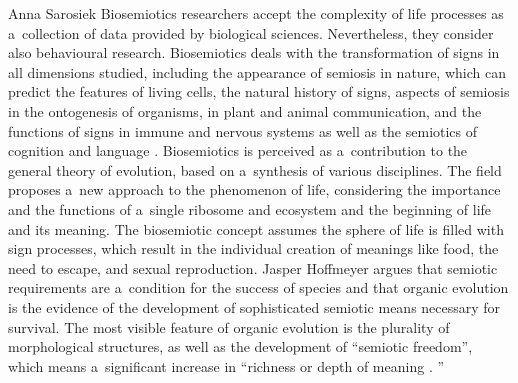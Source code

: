 \begin{artengenv}{Anna Sarosiek}
Biosemiotics researchers accept the complexity of life processes as a~collection of data provided by biological sciences. Nevertheless, they consider also behavioural research. Biosemiotics deals with the transformation of signs in all dimensions studied, including the appearance of semiosis in nature, which can predict the features of living cells, the natural history of signs, aspects of semiosis in the ontogenesis of organisms, in plant and animal communication, and the functions of signs in immune and nervous systems as well as the semiotics of cognition and language
\parencite[][p.78]{emmeche_modeling_1992}. %
 Biosemiotics is perceived as a~contribution to the general theory of evolution, based on a~synthesis of various disciplines. The field proposes a~new approach to the phenomenon of life, considering the importance and the functions of a~single ribosome and ecosystem and the beginning of life and its meaning. The biosemiotic concept assumes the sphere of life is filled with sign processes, which result in the individual creation of meanings like food, the need to escape, and sexual reproduction. Jasper Hoffmeyer argues that semiotic requirements are a~condition for the success of species and that organic evolution is the evidence of the development of sophisticated semiotic means necessary for survival. The most visible feature of organic evolution is the plurality of morphological structures, as well as the development of ``semiotic freedom'', which means a~significant increase in ``richness or depth of meaning 
\parencite[][p.61]{hoffmeyer_signs_1996}.%
''


\end{artengenv}
